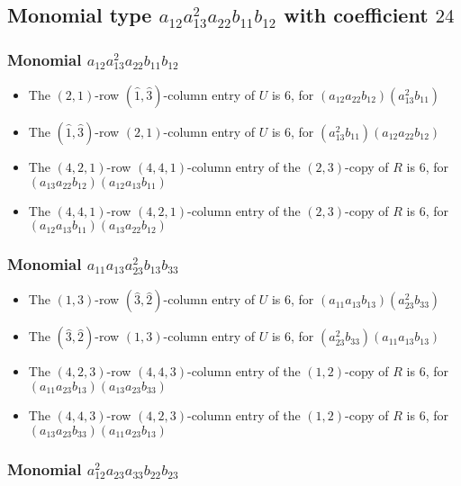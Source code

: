 \documentclass{article}
\begin{document}
\subsection{Monomial type $ a_{12} a_{13}^{2} a_{22} b_{11} b_{12} $ with coefficient $ 24 $}

\subsubsection{Monomial $ a_{12} a_{13}^{2} a_{22} b_{11} b_{12} $}

\begin{itemize}
\item The $ \left(2, 1\right) $-row $ (\hat{1}, \hat{3}) $-column entry of $U$ is $ 6 $, for $( a_{12} a_{22} b_{12} )( a_{13}^{2} b_{11} )$ 
\item The $(\hat{1}, \hat{3})$-row $ \left(2, 1\right) $-column entry of $U$ is $ 6 $, for $( a_{13}^{2} b_{11} )( a_{12} a_{22} b_{12} )$ 
\item The $(4, 2, 1)$-row $(4, 4, 1)$-column entry of the $ \left(2, 3\right) $-copy of $R$ is $ 6 $, for $( a_{13} a_{22} b_{12} )( a_{12} a_{13} b_{11} )$ 
\item The $(4, 4, 1)$-row $(4, 2, 1)$-column entry of the $ \left(2, 3\right) $-copy of $R$ is $ 6 $, for $( a_{12} a_{13} b_{11} )( a_{13} a_{22} b_{12} )$ 
\end{itemize}
\subsubsection{Monomial $ a_{11} a_{13} a_{23}^{2} b_{13} b_{33} $}

\begin{itemize}
\item The $ \left(1, 3\right) $-row $ (\hat{3}, \hat{2}) $-column entry of $U$ is $ 6 $, for $( a_{11} a_{13} b_{13} )( a_{23}^{2} b_{33} )$ 
\item The $(\hat{3}, \hat{2})$-row $ \left(1, 3\right) $-column entry of $U$ is $ 6 $, for $( a_{23}^{2} b_{33} )( a_{11} a_{13} b_{13} )$ 
\item The $(4, 2, 3)$-row $(4, 4, 3)$-column entry of the $ \left(1, 2\right) $-copy of $R$ is $ 6 $, for $( a_{11} a_{23} b_{13} )( a_{13} a_{23} b_{33} )$ 
\item The $(4, 4, 3)$-row $(4, 2, 3)$-column entry of the $ \left(1, 2\right) $-copy of $R$ is $ 6 $, for $( a_{13} a_{23} b_{33} )( a_{11} a_{23} b_{13} )$ 
\end{itemize}
\subsubsection{Monomial $ a_{12}^{2} a_{23} a_{33} b_{22} b_{23} $}
\end{document}
